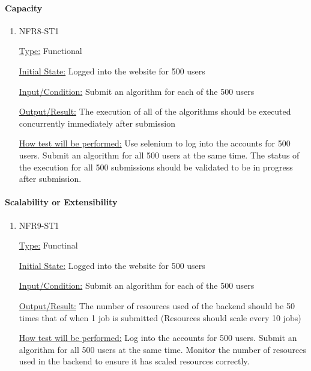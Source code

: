 \documentclass[12pt, titlepage]{article}
\begin{document}
\paragraph{Capacity}

\begin{enumerate}

\item{NFR8-ST1\\}

\underline{Type:} Functional

\underline{Initial State:} Logged into the website for 500 users

\underline{Input/Condition:} Submit an algorithm for each of the 500 users

\underline{Output/Result:} The execution of all of the algorithms should be executed concurrently immediately after submission

\underline{How test will be performed:} 
Use selenium to log into the accounts for 500 users. Submit an algorithm for all 500 users at the same time. The status of the execution for all 500 submissions should be validated to be in progress after submission.

\end{enumerate}

\paragraph{Scalability or Extensibility}

\begin{enumerate}

\item{NFR9-ST1\\}

\underline{Type:} Functinal

\underline{Initial State:} Logged into the website for 500 users

\underline{Input/Condition:} Submit an algorithm for each of the 500 users

\underline{Output/Result:} The number of resources used of the backend should be 50 times that of when 1 job is submitted (Resources should scale every 10 jobs)

\underline{How test will be performed:} 
Log into the accounts for 500 users. Submit an algorithm for all 500 users at the same time. Monitor the number of resources used in the backend to ensure it has scaled resources correctly.

\end{enumerate}
\end{document}
